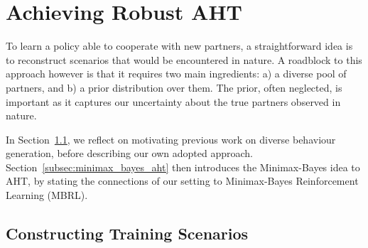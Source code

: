 \section{Achieving Robust AHT}
\label{seq:robust_aht}




To learn a policy able to cooperate with new partners, a straightforward idea is to reconstruct scenarios that would be encountered in nature. A roadblock to this approach however is that it requires two main ingredients: a) a diverse pool of partners, and b) a prior distribution over them. The prior, often neglected, is important as it captures our uncertainty about the true partners observed in nature.

In Section~\ref{subsec:constructing_training_scenarios}, we reflect on motivating previous work on diverse behaviour generation, before describing our own adopted approach. Section~\ref{subsec:minimax_bayes_aht} then introduces the Minimax-Bayes idea to AHT, by stating the connections of our setting to Minimax-Bayes Reinforcement Learning (MBRL).

\subsection{Constructing Training Scenarios}
\label{subsec:constructing_training_scenarios}


